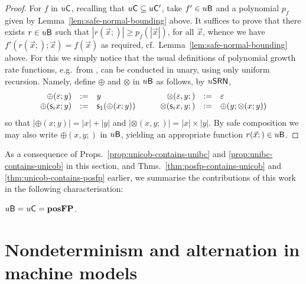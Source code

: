 \documentclass{lmcs}
\begin{document}
\begin{proof}
	For $f$ in  $u \mathsf{C}$, recalling that $u \mathsf{C}\subseteq u \mathsf{C}'$, take $f'\in u \mathsf{B}$ and a polynomial $p_f$ given by Lemma~\ref{lem:safe-normal-bounding} above. It suffices to prove that there exists $r\in u \mathsf{B}$ such that $|r(\vec x;)|\geq p_f (|\vec x|)$, for all $\vec x$, whence we have $f' (r(\vec x;);\vec x) = f(\vec x)$ as required, cf.~Lemma~\ref{lem:safe-normal-bounding} above.
%	
	For this we simply notice that the usual definitions of polynomial growth rate functions, e.g.\ from \cite{BelCoo92}, can be conducted in unary, using only uniform recursion. Namely, define $\oplus$ and $\otimes$ in $u \mathsf{B}$ as follows, by $u \mathsf{SRN}$, 
	\[
	\begin{array}{rcl}
	\oplus (\varepsilon ; y) & := & y \\
	\oplus (\mathsf s_{i} x ; y) & := & \mathsf s_{1} (\oplus(x ; y) ) 
	\end{array}
	\qquad
	\begin{array}{rcl}
	\otimes (\varepsilon , y ; ) & := & \varepsilon \\
	\otimes (\mathsf s_{i} x , y; ) & := & \oplus ( y ; \otimes(x;y) )
	\end{array}
	\]
	so that $|\oplus(x;y)|=|x|+|y|$ and $|\otimes (x,y;)|=|x|\times |y|$. 
	By safe composition we may also write $\oplus(x,y;)$ in $u \mathsf{B}$, yielding an appropriate function $r(\vec x ; ) \in u \mathsf{B}$. 
\end{proof}

As a consequence of Props.~\ref{prop:unicob-contains-unibc} and \ref{prop:unibc-contains-unicob} in this section, and Thms.~\ref{thm:posfp-contains-unicob} and \ref{thm:unicob-contains-posfp} earlier, we summarise the contributions of this work in the following characterisation:

\begin{theorem}
	\label{thm:unibc-eq-unicob}
	$u \mathsf{B} = u \mathsf{C} = \mathbf{pos}\mathbf{FP}$.
\end{theorem}






\section{Nondeterminism and alternation in machine models}
\end{document}
